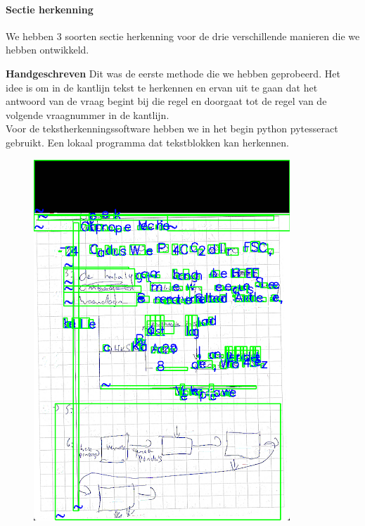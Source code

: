 \documentclass[12pt]{article}
\begin{document}
\paragraph*{Sectie herkenning} We hebben 3 soorten sectie herkenning voor de drie verschillende manieren die we hebben ontwikkeld. 
\begin{multicols}{2} 
\textbf{Handgeschreven} 
Dit was de eerste methode die we hebben geprobeerd. Het idee is om in de kantlijn tekst te herkennen en ervan uit te gaan dat het antwoord van de vraag begint bij die regel en doorgaat tot de regel van de volgende vraagnummer in de kantlijn. \\
Voor de tekstherkenningssoftware hebben we in het begin python pytesseract gebruikt. Een lokaal programma dat tekstblokken kan herkennen.
\begin{figure}[H]
    \centering
    \includegraphics[width=\linewidth]{./images/methoden/inscannen/sectie/hand/handgeschreven.png}

\end{figure}
\end{multicols}
\end{document}
